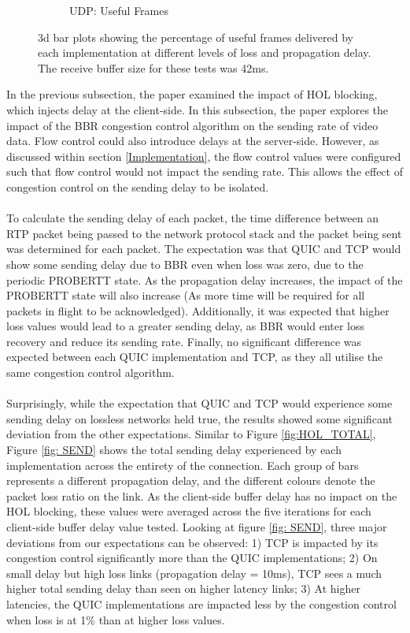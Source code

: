 \documentclass{mpaper}
\begin{document}
\begin{figure}
\begin{subfigure}[b]{0.25\textwidth}
      \caption{UDP: Useful Frames}
      \label{fig:UDP_bar-42}
  \end{subfigure}
     \vspace{0.1cm}
     \centering
     \caption{3d bar plots showing the percentage of useful frames delivered by each implementation at different levels of loss and propagation delay. The receive buffer size for these tests was 42ms.}
     \label{fig: 42-bar}
\end{figure}

\noindent In the previous subsection, the paper examined the impact of HOL blocking, which injects delay at the client-side. In this subsection, the paper explores the impact of the BBR congestion control algorithm on the sending rate of video data. Flow control could also introduce delays at the server-side. However, as discussed within section \ref{Implementation}, the flow control values were configured such that flow control would not impact the sending rate. This allows the effect of congestion control on the sending delay to be isolated.
\\\\
To calculate the sending delay of each packet, the time difference between an RTP packet being passed to the network protocol stack and the packet being sent was determined for each packet. The expectation was that QUIC and TCP would show some sending delay due to BBR even when loss was zero, due to the periodic PROBERTT state. As the propagation delay increases, the impact of the PROBERTT state will also increase (As more time will be required for all packets in flight to be acknowledged). Additionally, it was expected that higher loss values would lead to a greater sending delay, as BBR would enter loss recovery and reduce its sending rate. Finally, no significant difference was expected between each QUIC implementation and TCP, as they all utilise the same congestion control algorithm.
\\\\
Surprisingly, while the expectation that QUIC and TCP would experience some sending delay on lossless networks held true, the results showed some significant deviation from the other expectations. Similar to Figure \ref{fig:HOL_TOTAL}, Figure \ref{fig: SEND} shows the total sending delay experienced by each implementation across the entirety of the connection. Each group of bars represents a different propagation delay, and the different colours denote the packet loss ratio on the link. As the client-side buffer delay has no impact on the HOL blocking, these values were averaged across the five iterations for each client-side buffer delay value tested. Looking at figure \ref{fig: SEND}, three major deviations from our expectations can be observed: 1) TCP is impacted by its congestion control significantly more than the QUIC implementations; 2) On small delay but high loss links (propagation delay = 10ms), TCP sees a much higher total sending delay than seen on higher latency links; 3) At higher latencies, the QUIC implementations are impacted less by the congestion control when loss is at 1\% than at higher loss values.
\end{document}
